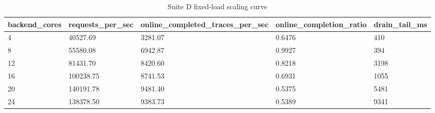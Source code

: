 \begin{table}[htbp]
\centering
\caption{Suite D fixed-load scaling curve}
\begin{tabular}{lllll}
\hline
backend\_cores & requests\_per\_sec & online\_completed\_traces\_per\_sec & online\_completion\_ratio & drain\_tail\_ms \\
\hline
4 & 40527.69 & 3281.07 & 0.6476 & 410 \\
8 & 55580.08 & 6942.87 & 0.9927 & 394 \\
12 & 81431.70 & 8420.60 & 0.8218 & 3198 \\
16 & 100238.75 & 8741.53 & 0.6931 & 1055 \\
20 & 140191.78 & 9481.40 & 0.5375 & 5481 \\
24 & 138378.50 & 9383.73 & 0.5389 & 9341 \\
\hline
\end{tabular}
\end{table}
